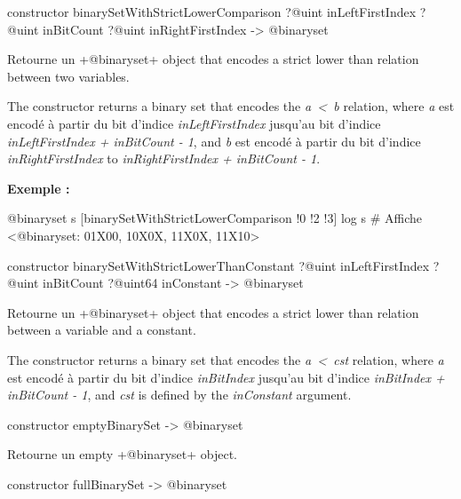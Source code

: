 \begin{galgasbox}
constructor binarySetWithStrictLowerComparison
  ?@uint inLeftFirstIndex
  ?@uint inBitCount
  ?@uint inRightFirstIndex
  -> @binaryset
\end{galgasbox}


Retourne un \ggs+@binaryset+ object that encodes a strict lower than relation between two variables.

The constructor returns a binary set that encodes the \emph{a~<~b} relation, where \emph{a} est encodé à partir du bit d'indice \emph{inLeftFirstIndex} jusqu'au bit d'indice \emph{inLeftFirstIndex  + inBitCount - 1}, and \emph{b} est encodé à partir du bit d'indice \emph{inRightFirstIndex} to \emph{inRightFirstIndex + inBitCount - 1}.

\textbf{Exemple :}
\begin{galgas}
@binaryset s [binarySetWithStrictLowerComparison !0 !2 !3]
log s # Affiche <@binaryset: 01X00, 10X0X, 11X0X, 11X10>
\end{galgas}





\begin{galgasbox}
constructor binarySetWithStrictLowerThanConstant
  ?@uint inLeftFirstIndex
  ?@uint inBitCount
  ?@uint64 inConstant
  -> @binaryset
\end{galgasbox}


Retourne un \ggs+@binaryset+ object that encodes a strict lower than relation between a variable and a constant.

The constructor returns a binary set that encodes the \emph{a~<~cst} relation, where \emph {a} est encodé à partir du bit d'indice \emph{inBitIndex} jusqu'au bit d'indice \emph{inBitIndex  + inBitCount - 1}, and \emph{cst} is defined by the \emph{inConstant} argument.





\begin{galgasbox}
constructor emptyBinarySet -> @binaryset
\end{galgasbox}


Retourne un empty \ggs+@binaryset+ object.






\begin{galgasbox}
constructor fullBinarySet -> @binaryset
\end{galgasbox}

